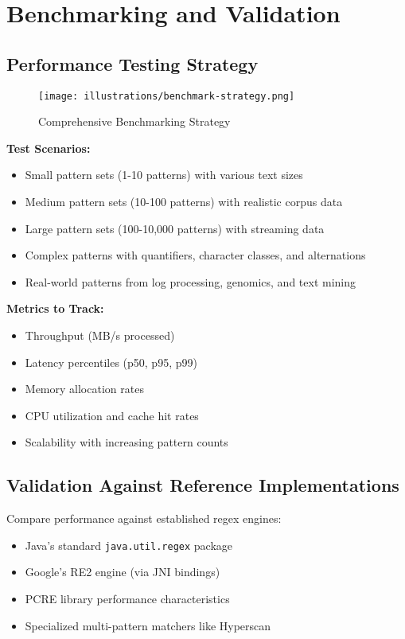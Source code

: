 \documentclass[11pt,a4paper]{article}
\begin{document}
\section{Benchmarking and Validation}

\subsection{Performance Testing Strategy}

\begin{figure}[htbp]
\centering
\texttt{[image: illustrations/benchmark-strategy.png]}
\caption{Comprehensive Benchmarking Strategy}
\label{fig:benchmark}
\end{figure}

\textbf{Test Scenarios:}
\begin{itemize}
\item Small pattern sets (1-10 patterns) with various text sizes
\item Medium pattern sets (10-100 patterns) with realistic corpus data  
\item Large pattern sets (100-10,000 patterns) with streaming data
\item Complex patterns with quantifiers, character classes, and alternations
\item Real-world patterns from log processing, genomics, and text mining
\end{itemize}

\textbf{Metrics to Track:}
\begin{itemize}
\item Throughput (MB/s processed)
\item Latency percentiles (p50, p95, p99)
\item Memory allocation rates
\item CPU utilization and cache hit rates
\item Scalability with increasing pattern counts
\end{itemize}

\subsection{Validation Against Reference Implementations}

Compare performance against established regex engines:
\begin{itemize}
\item Java's standard \texttt{java.util.regex} package
\item Google's RE2 engine (via JNI bindings)
\item PCRE library performance characteristics
\item Specialized multi-pattern matchers like Hyperscan
\end{itemize}
\end{document}
